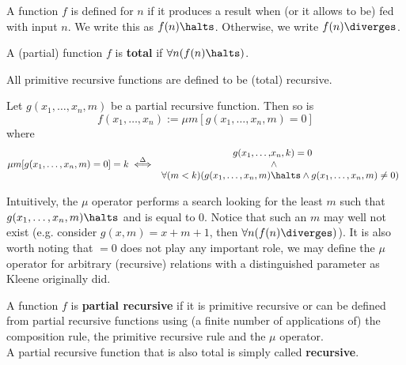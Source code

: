 \documentclass[../main.tex]{memoir}
\begin{document}
\begin{definition}
  A function $f$ is defined for $n$ if it produces a result when (or it allows to be) fed with input $n$. We write this as $f(n) \halts$. Otherwise, we write $f(n) \diverges$.
\end{definition}

\begin{definition}
  A (partial) function $f$ is \textbf{total} if $\forall n (f(n) \halts)$.
\end{definition}

\begin{definition}
  All primitive recursive functions are defined to be (total) recursive.
\end{definition}

\begin{definition}[$\mu$-operator]
  Let $g(x_1, \ldots, x_n, m)$ be a partial recursive function. Then so is
  \[ f(x_1, \ldots, x_n) := \mu m [g(x_1, \ldots, x_n, m) = 0] \]
  where
  \begin{equation*}
    \mu m [g(x_1, \ldots, x_n, m) = 0] = k \overset{\Delta}{\iff}
    \begin{array}{r@{}l}
      g(x_1, \ldots, & x_n, k) = 0 \\
      & \land \\
      \forall (m < k) (g(x_1, \ldots, x_n, m) & \halts \land g(x_1, \ldots, x_n, m) \neq 0)
    \end{array}
  \end{equation*}
\end{definition}

\begin{remark}
  Intuitively, the $\mu$ operator performs a search looking for the least $m$ such that $g(x_1, \ldots, x_n, m) \halts$ and is equal to $0$. Notice that such an $m$ may well not exist (e.g. consider $g(x, m) = x + m + 1$, then $\forall n (f(n) \diverges)$). It is also worth noting that $= 0$ does not play any important role, we may define the $\mu$ operator for arbitrary (recursive) relations with a distinguished parameter as Kleene originally did. \cite{kleene}
\end{remark}

\begin{definition}
  A function $f$ is \textbf{partial recursive} if it is primitive recursive or can be defined from partial recursive functions using (a finite number of applications of) the composition rule, the primitive recursive rule and the $\mu$ operator. \\
  A partial recursive function that is also total is simply called \textbf{recursive}.
\end{definition}
\end{document}
